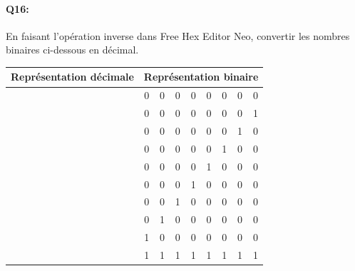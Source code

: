 \documentclass{article}
\begin{document}
\paragraph{Q16:}
En faisant l'opération inverse dans \og{}Free Hex Editor Neo\fg{}, convertir les nombres binaires ci-dessous en décimal.

\vspace{1em}
\begin{center}
	\begin{Form}
		\begin{tabular}{|>{\centering\arraybackslash}m{8em}||c|c|c|c|c|c|c|c|}
			\hline
			Représentation décimale & \multicolumn{8}{c|}{Représentation binaire} \\
			\hline
			\hline
			\TextField[name=d0,width=6em]{} & 0 & 0 & 0 & 0 & 0 & 0 & 0 & 0\\
			\hline
			\TextField[name=d1,width=6em]{} & 0 & 0 & 0 & 0 & 0 & 0 & 0 & 1\\
			\hline
			\TextField[name=d2,width=6em]{} & 0 & 0 & 0 & 0 & 0 & 0 & 1 & 0\\
			\hline
			\TextField[name=d3,width=6em]{} & 0 & 0 & 0 & 0 & 0 & 1 & 0 & 0\\
			\hline
			\TextField[name=d4,width=6em]{} & 0 & 0 & 0 & 0 & 1 & 0 & 0 & 0\\
			\hline
			\TextField[name=d5,width=6em]{} & 0 & 0 & 0 & 1 & 0 & 0 & 0 & 0\\
			\hline
			\TextField[name=d6,width=6em]{} & 0 & 0 & 1 & 0 & 0 & 0 & 0 & 0\\
			\hline
			\TextField[name=d7,width=6em]{} & 0 & 1 & 0 & 0 & 0 & 0 & 0 & 0\\
			\hline
			\TextField[name=d8,width=6em]{} & 1 & 0 & 0 & 0 & 0 & 0 & 0 & 0\\
			\hline
			\TextField[name=d9,width=6em]{} & 1 & 1 & 1 & 1 & 1 & 1 & 1 & 1\\
			\hline
		\end{tabular}
	\end{Form}
\end{center}

\newpage
\end{document}
